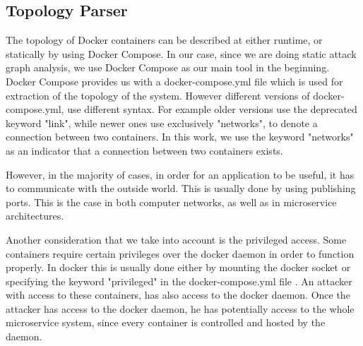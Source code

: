 \subsection{Topology Parser}
\label{chap:topology_p}

The topology of Docker containers can be described at either runtime, or statically by using Docker Compose. In our case, since we are doing static attack graph analysis, we use Docker Compose as our main tool in the beginning. Docker Compose provides us with a docker-compose.yml file which is used for extraction of the topology of the system. However different versions of docker-compose.yml, use different syntax. For example older versions use the deprecated keyword "link", while newer ones use exclusively "networks", to denote a connection between two containers. In this work, we use the keyword "networks" as an indicator that a connection between two containers exists.

However, in the majority of cases, in order for an application to be useful, it has to communicate with the outside world. This is usually done by using publishing ports. This is the case in both computer networks, as well as in microservice architectures.

Another consideration that we take into account is the privileged access. Some containers require certain privileges over the docker daemon in order to function properly. In docker this is usually done either by mounting the docker socket or specifying the keyword "privileged" in the docker-compose.yml file . An attacker with access to these containers, has also access to the docker daemon. Once the attacker has access to the docker daemon, he has potentially access to the whole microservice system, since every container is controlled and hosted by the daemon.





